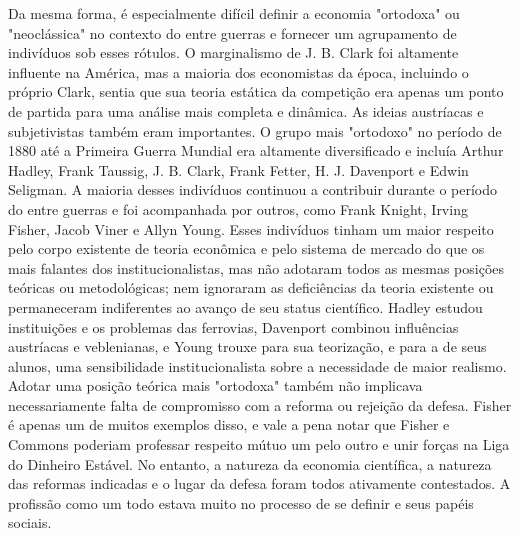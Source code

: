 \documentclass[a4paper,12pt]{article}[abntex2]
\begin{document}
Da mesma forma, é especialmente difícil definir a economia "ortodoxa" ou "neoclássica" no contexto do entre guerras e fornecer um agrupamento de indivíduos sob esses rótulos. O marginalismo de J. B. Clark foi altamente influente na América, mas a maioria dos economistas da época, incluindo o próprio Clark, sentia que sua teoria estática da competição era apenas um ponto de partida para uma análise mais completa e dinâmica. As ideias austríacas e subjetivistas também eram importantes. O grupo mais "ortodoxo" no período de 1880 até a Primeira Guerra Mundial era altamente diversificado e incluía Arthur Hadley, Frank Taussig, J. B. Clark, Frank Fetter, H. J. Davenport e Edwin Seligman. A maioria desses indivíduos continuou a contribuir durante o período do entre guerras e foi acompanhada por outros, como Frank Knight, Irving Fisher, Jacob Viner e Allyn Young. Esses indivíduos tinham um maior respeito pelo corpo existente de teoria econômica e pelo sistema de mercado do que os mais falantes dos institucionalistas, mas não adotaram todos as mesmas posições teóricas ou metodológicas; nem ignoraram as deficiências da teoria existente ou permaneceram indiferentes ao avanço de seu status científico. Hadley estudou instituições e os problemas das ferrovias, Davenport combinou influências austríacas e veblenianas, e Young trouxe para sua teorização, e para a de seus alunos, uma sensibilidade institucionalista sobre a necessidade de maior realismo. Adotar uma posição teórica mais "ortodoxa" também não implicava necessariamente falta de compromisso com a reforma ou rejeição da defesa. Fisher é apenas um de muitos exemplos disso, e vale a pena notar que Fisher e Commons poderiam professar respeito mútuo um pelo outro e unir forças na Liga do Dinheiro Estável. No entanto, a natureza da economia científica, a natureza das reformas indicadas e o lugar da defesa foram todos ativamente contestados. A profissão como um todo estava muito no processo de se definir e seus papéis sociais.
\end{document}

